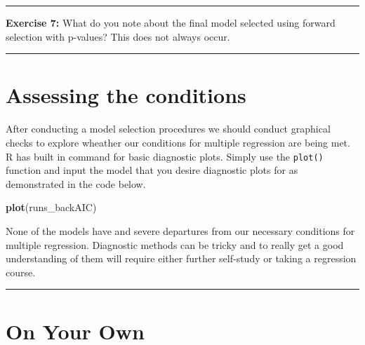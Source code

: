 \documentclass[]{book}
\newenvironment{Shaded}{\begin{snugshade}}{\end{snugshade}}
\newcommand{\KeywordTok}[1]{\textcolor[rgb]{0.13,0.29,0.53}{\textbf{{#1}}}}
\newcommand{\NormalTok}[1]{{#1}}
\theoremstyle{definition}
\theoremstyle{definition}
\theoremstyle{definition}
\theoremstyle{remark}
\begin{document}
\begin{center}\rule{0.5\linewidth}{\linethickness}\end{center}

\textbf{Exercise 7:} What do you note about the final model selected
using forward selection with p-values? This does not always occur.

\begin{center}\rule{0.5\linewidth}{\linethickness}\end{center}

\section{Assessing the conditions}\label{assessing-the-conditions}

After conducting a model selection procedures we should conduct
graphical checks to explore wheather our conditions for multiple
regression are being met. R has built in command for basic diagnostic
plots. Simply use the \texttt{plot()} function and input the model that
you desire diagnostic plots for as demonstrated in the code below.

\begin{Shaded}
\begin{Highlighting}[]
\KeywordTok{plot}\NormalTok{(runs_backAIC)}
\end{Highlighting}
\end{Shaded}

None of the models have and severe departures from our necessary
conditions for multiple regression. Diagnostic methods can be tricky and
to really get a good understanding of them will require either further
self-study or taking a regression course.

\begin{center}\rule{0.5\linewidth}{\linethickness}\end{center}

\section{On Your Own}\label{on-your-own-8}
\end{document}
